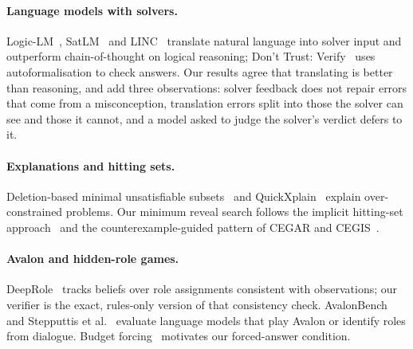 \documentclass[runningheads]{llncs}
\begin{document}
\paragraph{Language models with solvers.}
Logic-LM~\cite{pan2023logiclm}, SatLM~\cite{ye2023satlm} and LINC~\cite{olausson2023linc} translate natural language
into solver input and outperform chain-of-thought on logical reasoning; Don't Trust: Verify~\cite{zhou2024dtv} uses
autoformalisation to check answers. Our results agree that translating is better than reasoning, and add three
observations: solver feedback does not repair errors that come from a misconception, translation errors split into
those the solver can see and those it cannot, and a model asked to judge the solver's verdict defers to it.

\paragraph{Explanations and hitting sets.}
Deletion-based minimal unsatisfiable subsets~\cite{liffiton2008mus} and QuickXplain~\cite{junker2004quickxplain}
explain over-constrained problems. Our minimum reveal search follows the implicit hitting-set
approach~\cite{davies2011maxsat} and the counterexample-guided pattern of CEGAR and
CEGIS~\cite{clarke2000cegar,solarlezama2006sketch}.

\paragraph{Avalon and hidden-role games.}
DeepRole~\cite{serrino2019deeprole} tracks beliefs over role assignments consistent with observations; our verifier is
the exact, rules-only version of that consistency check. AvalonBench~\cite{light2023avalonbench} and Stepputtis et
al.~\cite{stepputtis2023avalon} evaluate language models that play Avalon or identify roles from dialogue.
Budget forcing~\cite{muennighoff2025s1} motivates our forced-answer condition.

\end{document}
